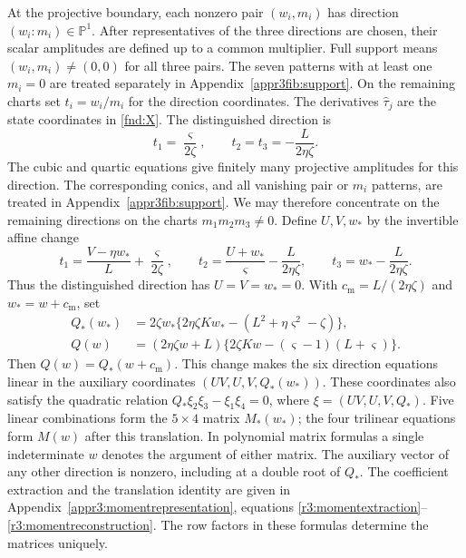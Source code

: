 \documentclass[11pt,a4paper]{article}
\numberwithin{equation}{section}
\theoremstyle{plain}
\theoremstyle{definition}
\theoremstyle{remark}
\begin{document}
At the projective boundary, each nonzero pair $(w_i,m_i)$ has direction
$(w_i:m_i)\in\mathbb P^1$. After representatives of the three
directions are chosen, their scalar amplitudes are defined up to a
common multiplier. Full support means $(w_i,m_i)\ne(0,0)$ for all
three pairs. The seven patterns with at least one $m_i=0$ are treated separately in
Appendix~\ref{appr3fib:support}. On the remaining charts set
$t_i=w_i/m_i$ for the direction coordinates. The derivatives
$\widehat\tau_j$ are the state coordinates in \eqref{fnd:X}.
The distinguished direction is
\[
 t_1=\frac{\varsigma }{2\zeta },\qquad t_2=t_3=-\frac{L}{2\eta \zeta }.
\]
The cubic and quartic equations give finitely many
projective amplitudes for this direction. The corresponding conics,
and all vanishing pair or $m_i$ patterns, are treated in
Appendix~\ref{appr3fib:support}. We may therefore concentrate on
the remaining directions on the charts $m_1m_2m_3\ne0$. Define
$U,V,w_*$ by the invertible affine change
\begin{equation}\label{r3:momentcoordinates}
 t_1=\frac{V-\eta w_*}{L}+\frac{\varsigma }{2\zeta },\qquad
 t_2=\frac{U+w_*}{\varsigma }-\frac{L}{2\eta \zeta },\qquad
 t_3=w_*-\frac{L}{2\eta \zeta }.
\end{equation}
Thus the distinguished direction has $U=V=w_*=0$. With
$c_{\mathrm m}=L/(2\eta \zeta )$ and $w_*=w+c_{\mathrm m}$, set
\begin{equation}\label{r3:momentquadratics}
\begin{aligned}
 Q_*(w_*)&=2\zeta w_*\{2\eta \zeta Kw_*-(L^2+\eta \varsigma ^2-\zeta )\},\\
 Q(w)&=(2\eta \zeta w+L)\{2\zeta Kw-(\varsigma -1)(L+\varsigma )\}.
\end{aligned}
\end{equation}
Then $Q(w)=Q_*(w+c_{\mathrm m})$. This change makes the
six direction equations linear in the auxiliary coordinates $(UV,U,V,Q_*(w_*))$.
These coordinates also satisfy the quadratic relation
$Q_*\xi_2\xi_3-\xi_1\xi_4=0$, where
$\xi=(UV,U,V,Q_*)$.
Five linear combinations form the $5\times4$ matrix $M_*(w_*)$;
the four trilinear equations form $M(w)$ after this
translation. In polynomial matrix formulas a single indeterminate
$w$ denotes the argument of either matrix. The auxiliary vector of any other
direction is nonzero, including at a double root of $Q_*$. The
coefficient extraction and the translation identity are given in
Appendix~\ref{appr3:momentrepresentation}, equations
\eqref{r3:momentextraction}--\eqref{r3:momentreconstruction}.
The row factors in these formulas determine the matrices uniquely.
\end{document}
